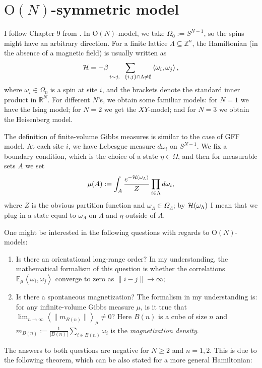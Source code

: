 \section{$\text{O}(N)$-symmetric model}
I follow Chapter 9 from \cite{friedli}. In $\text{O}(N)$-model, we take $\Omega_0 := S^{N-1}$, so the spins might have an arbitrary direction. For a finite lattice $\Lambda \subseteq \mathbb Z^n$, the Hamiltonian (in the absence of a magnetic field) is usually written as
\[
\hh = - \beta \sum_{i\sim j, \ \ \{i,j\}\cap \Lambda \neq \emptyset} \left\langle \omega_i,\omega_j \right\rangle,
\]
where $\omega_i \in \Omega_0$ is a spin at site $i$, and the brackets denote the standard inner product in $\mathbb R^N$. For different $N$'s, we obtain some familiar models: for $N=1$ we have the Ising model; for $N=2$ we get the $XY$-model; and for $N=3$ we obtain the Heisenberg model.

The definition of finite-volume Gibbs measures is similar to the case of GFF model. At each site $i$, we have Lebesgue measure $d\omega_i$ on $S^{N-1}$. We fix a boundary condition, which is the choice of a state $\eta \in \Omega$, and then for measurable sets $A$ we set
\[
\mu(A) := \int_A \frac{e^{-\mathcal{H}(\omega_{\Lambda})}}{Z} \prod_{i \in \Lambda} d\omega_i,
\]
where $Z$ is the obvious partition function and $\omega_{\Lambda} \in \Omega_{\Lambda}$; by $\mathcal{H}(\omega_{\Lambda})$ I mean that we plug in a state equal to $\omega_{\Lambda}$ on $\Lambda$ and $\eta$ outside of $\Lambda$.

One might be interested in the following questions with regards to $\text{O}(N)$-models:
\begin{enumerate}[1)]
\item Is there an orientational long-range order? In my understanding, the mathematical formalism of this question is whether the correlations $\mathbb E_{\mu}\left\langle \omega_i, \omega_j \right\rangle$ converge to zero as $\|i-j\| \rightarrow \infty$;
\item Is there a spontaneous magnetization? The formalism in my understanding is: for any infinite-volume Gibbs measure $\mu$, is it true that $\lim_{n \rightarrow \infty} \left\langle \|m_{B(n)}\| \right\rangle_{\mu} \neq 0$? Here $B(n)$ is a cube of size $n$ and $m_{B(n)} := \frac{1}{|B(n)|} \sum_{i \in B(n)} \omega_i$ is the \emph{magnetization density}.

\end{enumerate}
The answers to both questions are negative for $N \geq 2$ and $n=1,2$. This is due to the following theorem, which can be also stated for a more general Hamiltonian:

